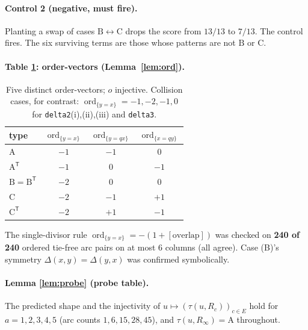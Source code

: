 \documentclass[11pt]{article}
\theoremstyle{plain}
\theoremstyle{definition}
\DeclareMathOperator{\ord}{ord}
\newcommand{\Dl}{\Delta}
\begin{document}
\paragraph{Control 2 (negative, must fire).}
Planting a swap of cases $\mathrm B\leftrightarrow\mathrm C$ drops the score
from $13/13$ to $7/13$. The control fires. The six surviving terms are those
whose patterns are not $\mathrm B$ or $\mathrm C$.

\paragraph{Table \ref{tab:ord}: order-vectors (Lemma~\ref{lem:ord}).}
\begin{table}[h]\centering
\begin{tabular}{lccc}
\toprule
type & $\ord_{\{y=x\}}$ & $\ord_{\{y=qx\}}$ & $\ord_{\{x=qy\}}$\\
\midrule
$\mathrm A$ & $-1$ & $-1$ & $0$\\
$\mathrm A^{\mathsf T}$ & $-1$ & $0$ & $-1$\\
$\mathrm B=\mathrm B^{\mathsf T}$ & $-2$ & $0$ & $0$\\
$\mathrm C$ & $-2$ & $-1$ & $+1$\\
$\mathrm C^{\mathsf T}$ & $-2$ & $+1$ & $-1$\\
\bottomrule
\end{tabular}
\caption{Five distinct order-vectors; $o$ injective. Collision cases, for
contrast: $\ord_{\{y=x\}}=-1,-2,-1,0$ for \texttt{delta2}(i),(ii),(iii) and
\texttt{delta3}.}
\label{tab:ord}
\end{table}

The single-divisor rule
$\ord_{\{y=x\}}=-(1+[\text{overlap}])$ was checked on \textbf{240 of 240}
ordered tie-free arc pairs on at most $6$ columns (all agree). Case (B)'s
symmetry $\Dl(x,y)=\Dl(y,x)$ was confirmed symbolically.

\paragraph{Lemma \ref{lem:probe} (probe table).}
The predicted shape and the injectivity of $u\mapsto(\tau(u,R_c))_{c\in E}$ hold
for $a=1,2,3,4,5$ (arc counts $1,6,15,28,45$), and
$\tau(u,R_\infty)=\mathrm A$ throughout.
\end{document}
